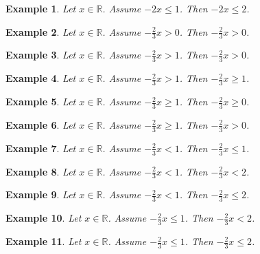 \documentclass{article}
\newtheorem{example}{Example}
\begin{document}
\begin{example}
Let $x\in\mathbb{R}$. Assume $-2x\le 1$. Then $-2x\le 2$.
\end{example}


\begin{example}
Let $x\in\mathbb{R}$. Assume $-\frac{2}{3}x>0$. Then $-\frac{2}{3}x>0$.
\end{example}

\begin{example}
Let $x\in\mathbb{R}$. Assume $-\frac{2}{3}x>1$. Then $-\frac{2}{3}x>0$.
\end{example}

\begin{example}
Let $x\in\mathbb{R}$. Assume $-\frac{2}{3}x>1$. Then $-\frac{2}{3}x\ge 1$.
\end{example}

\begin{example}
Let $x\in\mathbb{R}$. Assume $-\frac{2}{3}x\ge 1$. Then $-\frac{2}{3}x\ge 0$.
\end{example}

\begin{example}
Let $x\in\mathbb{R}$. Assume $-\frac{2}{3}x\ge 1$. Then $-\frac{2}{3}x> 0$.
\end{example}

\begin{example}
Let $x\in\mathbb{R}$. Assume $-\frac{2}{3}x<1$. Then $-\frac{2}{3}x\le 1$.
\end{example}

\begin{example}
Let $x\in\mathbb{R}$. Assume $-\frac{2}{3}x<1$. Then $-\frac{2}{3}x<2$.
\end{example}

\begin{example}
Let $x\in\mathbb{R}$. Assume $-\frac{2}{3}x<1$. Then $-\frac{2}{3}x\le 2$.
\end{example}

\begin{example}
Let $x\in\mathbb{R}$. Assume $-\frac{2}{3}x\le 1$. Then $-\frac{2}{3}x<2$.
\end{example}

\begin{example}
Let $x\in\mathbb{R}$. Assume $-\frac{2}{3}x\le 1$. Then $-\frac{2}{3}x\le 2$.
\end{example}
\end{document}
